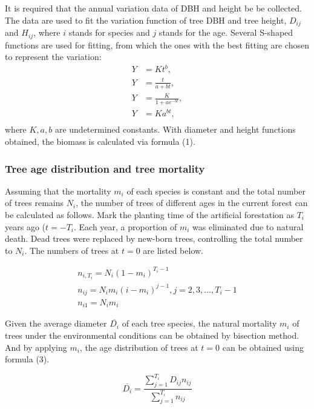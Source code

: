 It is required that the annual variation data of DBH and height be be collected. The data are used to fit the variation function of tree DBH and tree height, $D_{ij}$ and $H_{ij}$, where $i$ stands for species and $j$ stands for the age. Several S-shaped functions are used for fitting, from which the ones with the best fitting are chosen to represent the variation:
\begin{equation}
\begin{aligned}
    Y&=Kt^{b},\\
    Y&=\frac{t}{a+b t},\\
    Y&=\frac{K}{1+a e^{-bt}},\\
    Y&=K a^{b t},\\
\end{aligned}
\end{equation}
where $K,a,b$ are undetermined constants. With diameter and height functions obtained, the biomass is calculated via formula (1).

\subsubsection{Tree age distribution and tree mortality}
Assuming that the mortality $m_i$ of each species is constant and the total number of trees remains $N_i$, the number of trees of different ages in the current forest can be calculated as follows.
Mark the planting time of the artificial forestation as $T_i$ years ago ($t=-T_i$. Each year, a proportion of $m_i$ was eliminated due to natural death. Dead trees were replaced by new-born trees, controlling the total number to $N_i$. The numbers of trees at $t=0$ are listed below.

\begin{equation}
\begin{array}{c}
n_{i, T_{i}} = N_{i}\left(1-m_{i}\right)^{T_{i}-1} \\
n_{i j} = N_{i} m_{i}\left(i-m_{i}\right)^{j-1}, j = 2,3, \ldots, T_{i}-1 \\
n_{i 1} = N_{i} m_{i}
\end{array}
\end{equation}

Given the average diameter $\overline{D_{i}}$  of each tree species, the natural mortality $m_i$ of trees under the environmental conditions can be obtained by bisection method. And by applying $m_i$, the age distribution of trees at $t=0$ can be obtained using formula (3).

\begin{equation}
\overline{D_{i}}=\frac{\sum_{j=1}^{T_{i}} D_{i j} n_{i j}}{\sum_{j=1}^{T_{i}} n_{i j}}
\end{equation}

